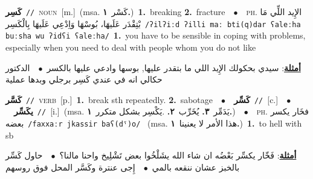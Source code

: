 \documentclass[10pt,a4paper,twoside]{article} %
\begin{document}
\begin{multicols}{2}
{\setlength\topsep{0pt}\textbf{\foreignlanguage{arabic}{كَسِر}}\ {\color{gray}\texttt{//}\color{black}}\ \textsc{noun}\ [m.]\ \color{gray}(msa. \foreignlanguage{arabic}{كَسْر}~\foreignlanguage{arabic}{\textbf{١.}})\color{black}\ \textbf{1.}~breaking  \textbf{2.}~fracture\ \ $\bullet$\ \ \textsc{ph.} \color{gray} \foreignlanguage{arabic}{الإِيد اللِّي مَا بْتِقْدَر عَلَيهَا، بُوسْهَا وَاِدْعِي عَلَيهَا بِالْكَسِر}\color{black}\ {\color{gray}\texttt{/{\sffamily ʔilʔiːd ʔilli maː bti(q)dar ʕaleːha buːsha wu ʔidʕi ʕaleːha}/}\color{black}}\ \textbf{1.}~you have to be sensible in coping with problems, especially when you need to deal with people whom you do not like\  \begin{flushright}\color{gray}\foreignlanguage{arabic}{\textbf{\underline{\foreignlanguage{arabic}{أمثلة}}}: سيدي بحكولك الإِيد اللي ما بتقدر عليها, بوسها وادعي عليها بالكسر\ $\bullet$\ \  الدكتور حكالي انه في عندي كَسِر برجلي وبدها عملية}\end{flushright}\color{black}} \vspace{2mm}

{\setlength\topsep{0pt}\textbf{\foreignlanguage{arabic}{كَسَّر}}\ {\color{gray}\texttt{//}\color{black}}\ \textsc{verb}\ [p.]\ \textbf{1.}~break sth repeatedly.  \textbf{2.}~sabotage\ \ $\bullet$\ \ \setlength\topsep{0pt}\textbf{\foreignlanguage{arabic}{كَسِّر}}\ {\color{gray}\texttt{//}\color{black}}\ [c.]\ \ $\bullet$\ \ \setlength\topsep{0pt}\textbf{\foreignlanguage{arabic}{يكَسِّر}}\ {\color{gray}\texttt{//}\color{black}}\ [i.]\ \color{gray}(msa. \foreignlanguage{arabic}{يَدَمِّر}~\foreignlanguage{arabic}{\textbf{٣.}}  \foreignlanguage{arabic}{يُخَرِّب}~\foreignlanguage{arabic}{\textbf{٢.}}  .\foreignlanguage{arabic}{يَكْسِر بشكل متكرر}~\foreignlanguage{arabic}{\textbf{١.}})\color{black}\ \ $\bullet$\ \ \textsc{ph.} \color{gray} \foreignlanguage{arabic}{فخَار يكسر بعضه}\color{black}\ {\color{gray}\texttt{/{\sffamily faxxaːr jkassir baʕ(dˤ)o}/}\color{black}}\ \color{gray} (msa. \foreignlanguage{arabic}{هذا الأمر لا يعنينا}~\foreignlanguage{arabic}{\textbf{١.}})\color{black}\ \textbf{1.}~to hell with sb\  \begin{flushright}\color{gray}\foreignlanguage{arabic}{\textbf{\underline{\foreignlanguage{arabic}{أمثلة}}}: فَخّار يكسِّر بَعْضُه ان شاء الله يشَلْخُوا بعض تَشْلِيخ واحنا مالنا؟\ $\bullet$\ \  حاول كَسِّر بالخبز عشان ننقعه بالمي\ $\bullet$\ \  إِجى عنترة وكَسَّر المحل فوق روسهم}\end{flushright}\color{black}} \vspace{2mm}


\end{multicols}
\end{document}
